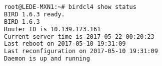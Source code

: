 \begin{lstlisting}[language=bash,caption={Bird status query.}]
root@LEDE-MXN1:~# birdcl4 show status
BIRD 1.6.3 ready.
BIRD 1.6.3
Router ID is 10.139.173.161
Current server time is 2017-05-22 00:20:23
Last reboot on 2017-05-10 19:31:09
Last reconfiguration on 2017-05-10 19:31:09
Daemon is up and running
\end{lstlisting}